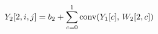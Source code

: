 \documentclass[preview]{standalone}
\begin{document}
\begin{align*}
\special{dvisvgm:raw <g id='unique000'>}Y_2[2,i,j]=b_2+\sum_{c=0}^{1}\text{conv}(Y_1[c],\,W_2[2,c])\special{dvisvgm:raw </g>}
\end{align*}
\end{document}
